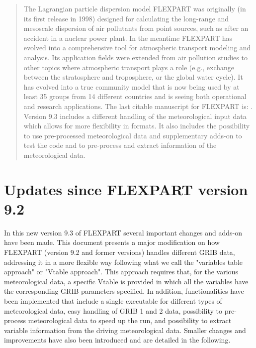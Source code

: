 \documentclass{egu}                  %
\begin{document}
\begin{abstract}
The Lagrangian particle dispersion model FLEXPART was originally (in its first
release in 1998) designed for calculating the long-range and mesoscale
dispersion of air pollutants from point sources, such as after an accident in a
nuclear power plant.  In the meantime FLEXPART has evolved into a comprehensive
tool for atmospheric transport modeling and analysis.  Its application fields
were extended from air pollution studies to other topics where atmospheric
transport plays a role (e.g., exchange between the stratosphere and
troposphere, or the global water cycle).  It has evolved into a true community
model that is now being used by at least 35 groups from 14 different countries
and is seeing both operational and research applications.  The last citable
manuscript for FLEXPART is: \citep{stohl2005}. Version 9.3 includes a different handling of the meteorological input data which allows for more flexibility in formats. It also includes the possibility to use pre-processed meteorological data and supplementary adds-on to test the code and to pre-process and extract information of the meteorological data.
\end{abstract}

\section{Updates since FLEXPART version 9.2} 

In this new version 9.3 of FLEXPART several important changes and adds-on have been made. This document presents a major modification on how FLEXPART (version 9.2 and former versions) handles different GRIB data, addressing it in a more flexible way following what we call the "variables table approach" or "Vtable approach". This approach requires that, for the various meteorological data, a specific Vtable is provided in which all the variables have the corresponding GRIB parameters specified. In addition, functionalities have been implemented that include a single executable for different types of meteorological data, easy handling of GRIB 1 and 2 data, possibility to pre-process meteorological data to speed up the run, and possibility to extract variable information from the driving meteorological data. Smaller changes and improvements have also been introduced and are detailed in the following.

\bigskip

\end{document}
